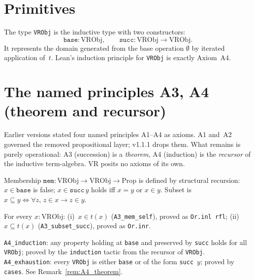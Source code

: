 \section{Primitives}
\label{sec:vr_primitives}

\begin{definition}
\label{def:VRObj}
\leanok
The type \texttt{VRObj} is the inductive type with two constructors:
\[
  \texttt{base} : \mathrm{VRObj}, \qquad
  \texttt{succ} : \mathrm{VRObj} \to \mathrm{VRObj}.
\]
It represents the domain generated from the base operation $\emptyset$
by iterated application of~$t$.  Lean's induction principle for
\texttt{VRObj} is exactly Axiom~A4.
\end{definition}

\section{The named principles A3, A4 (theorem and recursor)}
\label{sec:vr_axioms}

Earlier versions stated four named principles A1--A4 as axioms.  A1 and~A2
governed the removed propositional layer; v1.1.1 drops them.  What remains
is purely operational: A3 (succession) is a \emph{theorem}, A4 (induction)
is the \emph{recursor} of the inductive term-algebra.  VR posits no axioms
of its own.

\begin{definition}
\label{def:mem}
\leanok
{}
Membership $\texttt{mem} : \mathrm{VRObj} \to \mathrm{VRObj} \to
\mathrm{Prop}$ is defined by structural recursion: $x \in
\texttt{base}$ is false; $x \in \texttt{succ}\,y$ holds iff $x = y$
or $x \in y$.  Subset is $x \subseteq y \iff \forall z,\, z \in x \to z \in y$.
\end{definition}

\begin{theorem}[A3 --- Succession]
\label{thm:A3}
\leanok
{}
For every $x : \mathrm{VRObj}$: (i)~$x \in t(x)$ (\texttt{A3\_mem\_self}),
proved as \texttt{Or.inl rfl}; (ii)~$x \subseteq t(x)$
(\texttt{A3\_subset\_succ}), proved as \texttt{Or.inr}.
\end{theorem}

\begin{theorem}[A4 --- Induction]
\label{thm:A4}
\leanok
{}
\texttt{A4\_induction}: any property holding at \texttt{base} and
preserved by \texttt{succ} holds for all \texttt{VRObj}; proved by the
\texttt{induction} tactic from the recursor of \texttt{VRObj}.
\texttt{A4\_exhaustion}: every \texttt{VRObj} is either \texttt{base}
or of the form \texttt{succ}~$y$; proved by \texttt{cases}.  See
Remark~\ref{rem:A4_theorem}.
\end{theorem}

